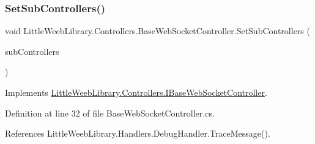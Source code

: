 \subsubsection{\texorpdfstring{Set\+Sub\+Controllers()}{SetSubControllers()}}
{\footnotesize\ttfamily void Little\+Weeb\+Library.\+Controllers.\+Base\+Web\+Socket\+Controller.\+Set\+Sub\+Controllers (\begin{DoxyParamCaption}\item[{List$<$ \mbox{\hyperlink{interface_little_weeb_library_1_1_controllers_1_1_i_sub_web_socket_controller}{I\+Sub\+Web\+Socket\+Controller}} $>$}]{sub\+Controllers }\end{DoxyParamCaption})}



Implements \mbox{\hyperlink{interface_little_weeb_library_1_1_controllers_1_1_i_base_web_socket_controller_a80d53e08202c06f729b0aa90d36c152f}{Little\+Weeb\+Library.\+Controllers.\+I\+Base\+Web\+Socket\+Controller}}.



Definition at line 32 of file Base\+Web\+Socket\+Controller.\+cs.



References Little\+Weeb\+Library.\+Handlers.\+Debug\+Handler.\+Trace\+Message().



